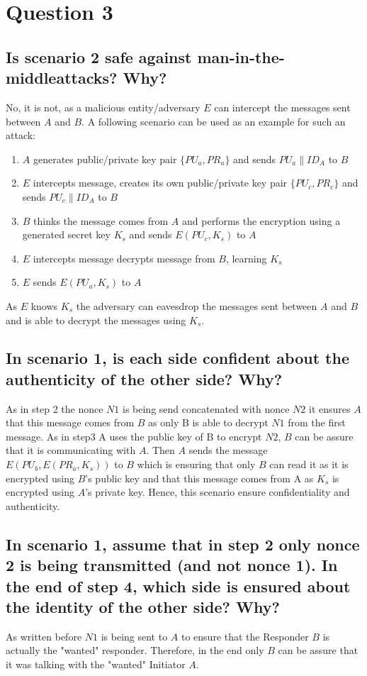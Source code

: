 \documentclass{report}
\begin{document}
	\section{Question 3}
	\startsection
		\renewcommand{\thesubsection}{\thesection.\Alph{subsection}}
		\subsection{Is scenario 2 safe against man-in-the-middleattacks? Why?}
		\startsubsection
			No, it is not, as a malicious entity/adversary $E$ can intercept the messages sent between $A$ and $B$. A following scenario can be used as an example for such an attack:
			\begin{enumerate}
				\item $A$ generates public/private key pair $\{ PU_a , PR_a \}$ and sends $PU_a \| ID_A$ to $B$
				\item $E$ intercepts message, creates its own public/private key pair $\{ PU_c , PR_c \}$ and sends $PU_c \| ID_A$ to $B$
				\item $B$ thinks the message comes from $A$ and performs the encryption using a generated secret key $K_s$ and sends $E(PU_c, K_s)$ to $A$
				\item $E$ intercepts message decrypts message from $B$, learning $K_s$
				\item $E$ sends $E(PU_a, K_s)$ to $A$
			\end{enumerate}
			As $E$ knows $K_s$ the adversary can eavesdrop the messages sent between $A$ and $B$ and is able to decrypt the messages using $K_s$.
		\closesection
		\subsection{In scenario 1, is each side confident about the authenticity of the other side? Why?}
		\startsubsection
			As in step 2 the nonce $N1$ is being send concatenated with nonce $N2$ it ensures $A$ that this message comes from $B$ as only B is able to decrypt $N1$ from the first message. As in step3 A uses the public key of B to encrypt $N2$, $B$ can be assure that it is communicating with $A$. Then $A$ sends the message $E(PU_b, E(PR_a, K_s))$ to $B$ which is ensuring that only $B$ can read it as it is encrypted using $B$'s public key and that this message comes from A as $K_s$ is encrypted using $A$'s private key. Hence, this scenario ensure confidentiality and authenticity.
		\closesection
		\subsection{In scenario 1, assume that in step 2 only nonce 2 is being transmitted (and not nonce 1). In the end of step 4, which side is ensured about the identity of the other side? Why?}
		\startsubsection
			As written before $N1$ is being sent to $A$ to ensure that the Responder $B$ is actually the "wanted" responder. Therefore, in the end only $B$ can be assure that it was talking with the "wanted" Initiator $A$.
		\closesection
	\closesection
\end{document}
